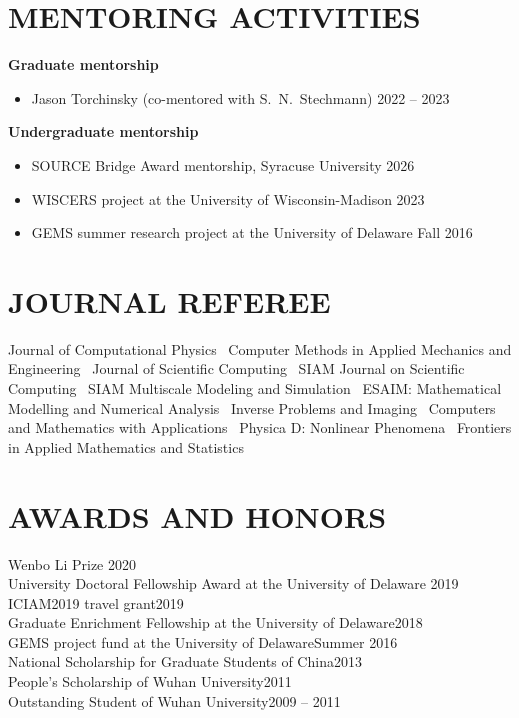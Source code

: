 \documentclass[11pt]{res}
\newenvironment{cvitemize}{\begin{itemize}\itemsep -2pt}{\end{itemize}\vspace{-5pt}}
\begin{document}
\begin{resume}



\section{MENTORING ACTIVITIES}
{\bf Graduate mentorship}
\begin{cvitemize}
\item
Jason Torchinsky (co-mentored with S.~N.~Stechmann)
\hfill 2022 -- 2023
\end{cvitemize}

{\bf Undergraduate mentorship}
\begin{cvitemize}
\item SOURCE Bridge Award mentorship, Syracuse University
\hfill 2026
\item WISCERS project at the University of Wisconsin-Madison
\hfill 2023

\item 
GEMS summer research project at the University of Delaware
\hfill Fall 2016
\end{cvitemize}

\section{JOURNAL REFEREE}
Journal of Computational Physics \textbullet\
Computer Methods in Applied Mechanics and Engineering \textbullet\
Journal of Scientific Computing \textbullet\
SIAM Journal on Scientific Computing \textbullet\
SIAM Multiscale Modeling and Simulation \textbullet\
ESAIM: Mathematical Modelling and Numerical Analysis \textbullet\
Inverse Problems and Imaging \textbullet\
Computers and Mathematics with Applications \textbullet\
Physica D: Nonlinear Phenomena \textbullet\
Frontiers in Applied Mathematics and Statistics

\section{AWARDS AND HONORS}
Wenbo Li Prize \hfill 2020\\
University Doctoral Fellowship Award at the University of Delaware \hfill 2019\\
ICIAM2019 travel grant\hfill 2019 \\
Graduate Enrichment Fellowship at the University of Delaware\hfill 2018\\
GEMS project fund at the University of Delaware\hfill Summer 2016\\
National Scholarship for Graduate Students of China\hfill 2013\\
People's Scholarship of Wuhan University\hfill 2011\\
Outstanding Student of Wuhan University\hfill 2009 -- 2011


\end{resume}
\end{document}
